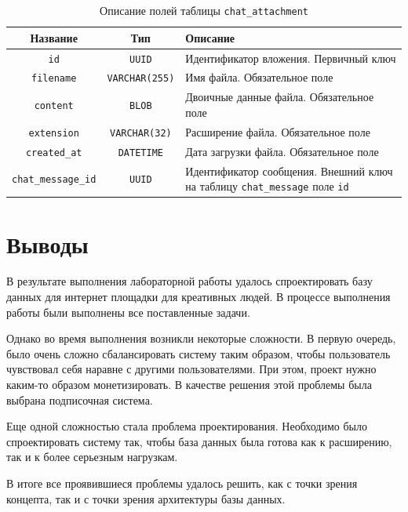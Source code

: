 \documentclass[a4paper,14pt]{extarticle}
\begin{document}
\begin{center}
    \begin{longtable}{|c|c|>{\centering\arraybackslash}m{8.2cm}|}
        \caption{Описание полей таблицы \texttt{chat\_attachment}}
        \label{tab:chat_attachment}
        \\
        \hline
        \textbf{Название}          & \textbf{Тип}          & \textbf{Описание}                                                                        \\
        \hline
        \texttt{id}                & \texttt{UUID}         & Идентификатор вложения. Первичный ключ                                                   \\
        \hline
        \texttt{filename}          & \texttt{VARCHAR(255)} & Имя файла. Обязательное поле                                                             \\
        \hline
        \texttt{content}           & \texttt{BLOB}         & Двоичные данные файла. Обязательное поле                                                 \\
        \hline
        \texttt{extension}         & \texttt{VARCHAR(32)}  & Расширение файла. Обязательное поле                                                      \\
        \hline
        \texttt{created\_at}       & \texttt{DATETIME}     & Дата загрузки файла. Обязательное поле                                                   \\
        \hline
        \texttt{chat\_message\_id} & \texttt{UUID}         & Идентификатор сообщения. Внешний ключ на таблицу \texttt{chat\_message} поле \texttt{id} \\
        \hline
    \end{longtable}
\end{center}

\section{Выводы}

В результате выполнения лабораторной работы удалось спроектировать базу данных для интернет площадки для креативных людей. В процессе выполнения работы были выполнены все поставленные задачи.

Однако во время выполнения возникли некоторые сложности. В первую очередь, было очень сложно сбалансировать систему таким образом, чтобы пользователь чувствовал себя наравне с другими пользователями. При этом, проект нужно каким-то образом монетизировать. В качестве решения этой проблемы была выбрана подписочная система.

Еще одной сложностью стала проблема проектирования. Необходимо было спроектировать систему так, чтобы база данных была готова как к расширению, так и к более серьезным нагрузкам.

В итоге все проявившиеся проблемы удалось решить, как с точки зрения концепта, так и с точки зрения архитектуры базы данных.
\end{document}
